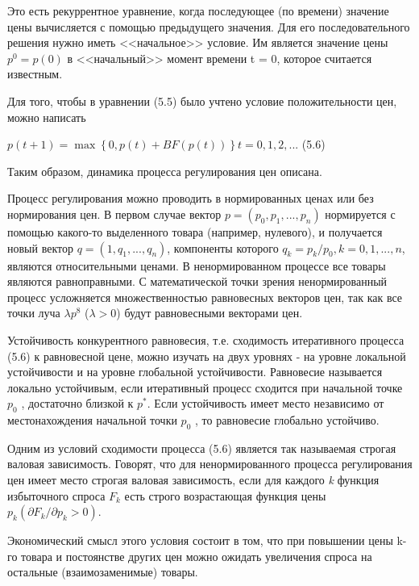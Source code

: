 \documentclass[12pt, 4paper]{book}
\begin{document}
{Это есть рекуррентное уравнение, когда последующее (по времени) значение цены вычисляется с помощью предыдущего значения. Для его последовательного решения нужно иметь <<начальное>> условие. Им является значение цены $p^0 = p(0)$ в <<начальный>> момент времени t = 0, которое считается известным.
\par

Для того, чтобы в уравнении (5.5) было учтено условие положительности цен, можно написать
\begin{center}
$p(t+1)=\max \left\{ 0,p(t) + BF(p(t))\right\} t=0,1,2,...$ (5.6)
\end{center}
\par

Таким образом, динамика процесса регулирования цен описана.
\par

Процесс регулирования можно проводить в нормированных ценах или без нормирования цен. В первом случае вектор $p=(p_0,p_1,...,p_n)$ нормируется с помощью какого-то выделенного товара (например, нулевого), и получается новый вектор $q=(1,q_1,...,q_n)$, компоненты которого $q_k = p_k/p_0 , k=0,1,...,n$, являются относительными ценами. В ненормированном процессе все товары являются равноправными. С математической точки зрения ненормированный процесс усложняется множественностью равновесных векторов цен, так как все точки луча $\lambda p^{8}$ ($\lambda > 0$) будут равновесными векторами цен.
\par

Устойчивость конкурентного равновесия, т.е. сходимость итеративного процесса (5.6) к равновесной цене, можно изучать на двух уровнях - на уровне локальной устойчивости и на уровне глобальной устойчивости. Равновесие называется локально устойчивым, если итеративный процесс сходится при начальной точке $p_0$ , достаточно близкой к $p^{*}$. Если устойчивость имеет место независимо от местонахождения начальной точки $p_0$ , то равновесие глобально устойчиво.
\par

Одним из условий сходимости процесса (5.6) является так называемая строгая валовая зависимость. Говорят, что для ненормированного процесса регулирования цен имеет место строгая валовая зависимость, если для каждого \textit{k} функция избыточного спроса $F_k$ есть строго возрастающая функция цены $p_k(\partial F_k / \partial p_k  > 0)$.
\par

Экономический смысл этого условия состоит в том, что при повышении цены k-го товара и постоянстве других цен можно ожидать увеличения спроса на остальные (взаимозаменимые) товары.
\par

}
\end{document}
